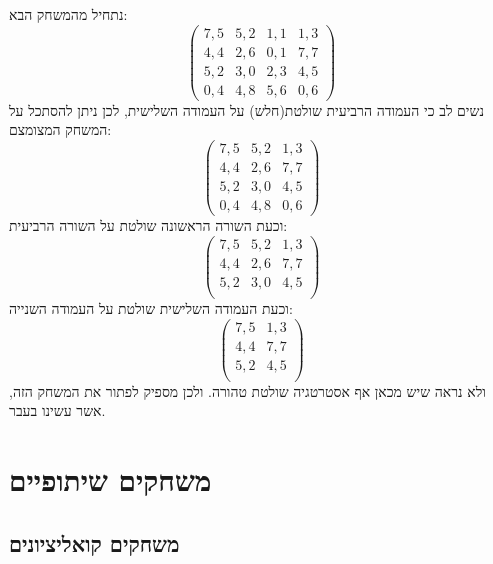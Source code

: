 \documentclass{tstextbook}
\begin{document}
\begin{example}
נתחיל מהמשחק הבא:
$$\begin{pmatrix}7,5 & 5,2 & 1,1 & 1,3 \\4,4 & 2,6 & 0,1 & 7,7 \\5,2 & 3,0 & 2,3 & 4,5 \\0,4 & 4,8 & 5,6 & 0,6
\end{pmatrix}$$
נשים לב כי העמודה הרביעית שולטת(חלש) על העמודה השלישית, לכן ניתן להסתכל על המשחק המצומצם:
$$\begin{pmatrix}7,5 & 5,2 &  1,3 \\4,4 & 2,6 &  7,7 \\5,2 & 3,0 &  4,5 \\0,4 & 4,8 &  0,6
\end{pmatrix}$$
וכעת השורה הראשונה שולטת על השורה הרביעית:
$$\begin{pmatrix}7,5 & 5,2 &  1,3 \\4,4 & 2,6 &  7,7 \\5,2 & 3,0 &  4,5 \\
\end{pmatrix}$$
וכעת העמודה השלישית שולטת על העמודה השנייה:
$$\begin{pmatrix}7,5 &  1,3 \\4,4 &   7,7 \\5,2 &   4,5 \\
\end{pmatrix}$$
ולא נראה שיש מכאן אף אסטרטגיה שולטת טהורה. ולכן מספיק לפתור את המשחק הזה, אשר עשינו בעבר.

\end{example}
\chapter{משחקים שיתופיים}

\section{משחקים קואליציונים}
\end{document}
